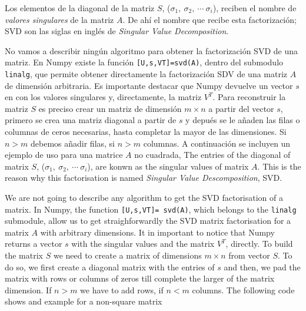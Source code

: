 \begin{paracol}{2}
Los elementos de la diagonal de la matriz $S$, ($\sigma_1, \ \sigma_2, \  \cdots \ \sigma_i$), reciben el nombre de \emph{valores singulares} de la matriz $A$. De ahí el nombre que recibe esta factorización; SVD son las siglas en inglés de \emph{Singular Value Decomposition}.

No vamos a describir ningún algoritmo para obtener la factorización SVD de una matriz. En Numpy existe la función \texttt{[U,s,VT]=svd(A)}, dentro del submodulo \texttt{linalg}, que permite obtener directamente la factorización SDV de una matriz $A$ de dimensión arbitraria. Es importante destacar que Numpy devuelve un vector $s$ en con los valores singulares y, directamente, la matriz $V^T$. Para reconstruir la matriz $S$ es preciso crear un matriz de dimensión $m\times n$ a partir del vector $s$, primero se crea una matriz diagonal a partir de $s$ y depués se le añaden las filas o columnas de ceros necesarias, hasta completar la mayor de las dimensiones. Si $n>m$ debemos añadir filas, si $n>m$ columnas. A continuación se incluyen un ejemplo de uso para una matrice $A$ no cuadrada,
\switchcolumn
The entries of the diagonal of matrix $S$, ($\sigma_1, \ \sigma_2, \  \cdots \ \sigma_i$), are konwn as the singular values of matrix $A$. This is the reason why this factorisation is named \emph{Singular Value Descomposition}, SVD.

We are not going to describe any algorithm to get the SVD factorisation of a matrix. In Numpy, the function \texttt{[U,s,VT]= svd(A)}, which belongs to the \texttt{linalg} submodule, allow us to get straighforwardly the SVD matrix factorisation for a matrix $A$ with arbitrary dimensions. It in important to notice that Numpy returns a vector $s$ with the singular values and the matrix $V^T$, directly. To build the matrix $S$ we need to create a matrix of dimensions $m\times n$ from vector $S$. To do so, we first create a diagonal matrix with the entries of $s$ and then, we pad the matrix with rows or columns of zeros till complete the larger of the matrix dimension. If $n>m$ we have to add rows, if $n<m$ columns. The following code shows and example for a non-square matrix  
\end{paracol}
